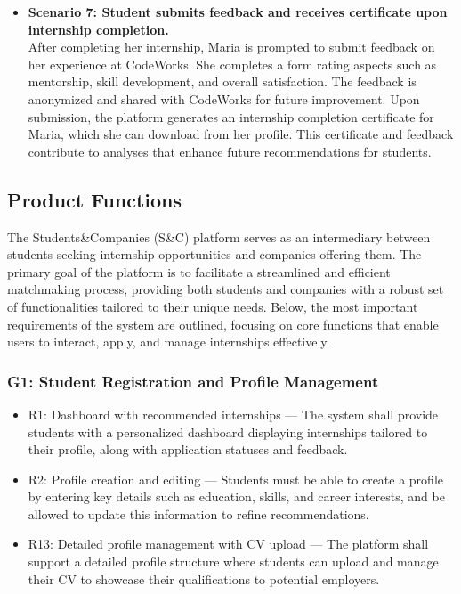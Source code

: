 \begin{itemize}
    \item \textbf{Scenario 7: Student submits feedback and receives certificate upon internship completion.}  \\
    After completing her internship, Maria is prompted to submit feedback on her experience at CodeWorks. She completes a form rating aspects such as mentorship, skill development, and overall satisfaction. The feedback is anonymized and shared with CodeWorks for future improvement. Upon submission, the platform generates an internship completion certificate for Maria, which she can download from her profile. This certificate and feedback contribute to analyses that enhance future recommendations for students.
\end{itemize}

\newpage

\subsection{Product Functions}

The Students\&Companies (S\&C) platform serves as an intermediary between students seeking internship opportunities and companies offering them. The primary goal of the platform is to facilitate a streamlined and efficient matchmaking process, providing both students and companies with a robust set of functionalities tailored to their unique needs. Below, the most important requirements of the system are outlined, focusing on core functions that enable users to interact, apply, and manage internships effectively.

\subsubsection{G1: Student Registration and Profile Management}
    \begin{itemize}
        \item R1: Dashboard with recommended internships — The system shall provide students with a personalized dashboard displaying internships tailored to their profile, along with application statuses and feedback.
        \item R2: Profile creation and editing — Students must be able to create a profile by entering key details such as education, skills, and career interests, and be allowed to update this information to refine recommendations.
        \item R13: Detailed profile management with CV upload — The platform shall support a detailed profile structure where students can upload and manage their CV to showcase their qualifications to potential employers.
    \end{itemize}

